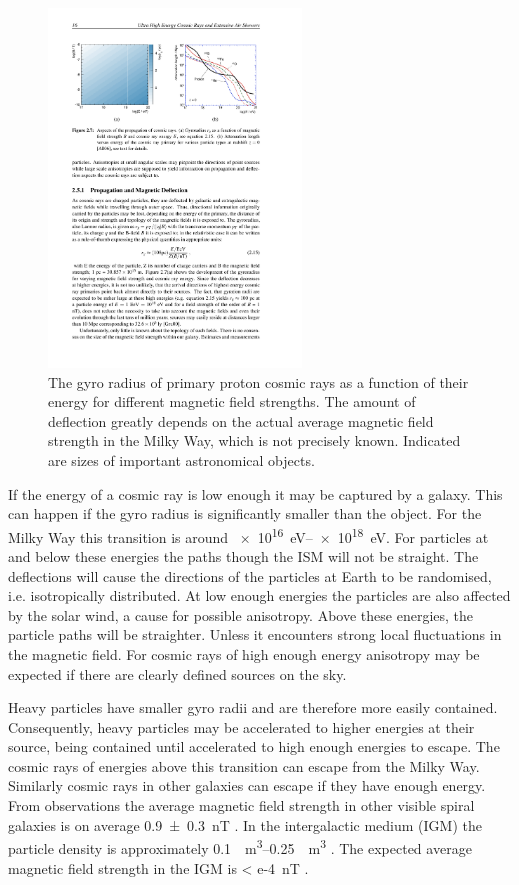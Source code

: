 \begin{figure}
    \centering
    \includegraphics[width=0.6\textwidth]
                    {plots/cosmic-rays/gyroradius}
    \caption{The gyro radius of primary proton cosmic rays as a function of their energy for different magnetic field strengths. The amount of deflection greatly depends on the actual average magnetic field strength in the Milky Way, which is not precisely known. Indicated are sizes of important astronomical objects.}
    \label{fig:gyroradius}
\end{figure}

If the energy of a cosmic ray is low enough it may be captured by a galaxy. This can happen if the gyro radius is significantly smaller than the object. For the Milky Way this transition is around \SIrange{e16}{e18}{\eV}. For particles at and below these energies the paths though the ISM will not be straight. The deflections will cause the directions of the particles at Earth to be randomised, i.e. isotropically distributed. At low enough energies the particles are also affected by the solar wind, a cause for possible anisotropy. Above these energies, the particle paths will be straighter. Unless it encounters strong local fluctuations in the magnetic field. For cosmic rays of high enough energy anisotropy may be expected if there are clearly defined sources on the sky.

Heavy particles have smaller gyro radii and are therefore more easily contained. Consequently, heavy particles may be accelerated to higher energies at their source, being contained until accelerated to high enough energies to escape. The cosmic rays of energies above this transition can escape from the Milky Way. Similarly cosmic rays in other galaxies can escape if they have enough energy. From observations the average magnetic field strength in other visible spiral galaxies is on average \SI{.9 \pm .3}{\nano\tesla} \cite{jansson2010magnetic}. In the intergalactic medium (IGM) the particle density is approximately \SIrange{0.1}{0.25}{\per\meter\cubed} \cite{copi1995igm}. The expected average magnetic field strength in the IGM is \SI{< e-4}{\nano\tesla} \cite{kronberg1994igm}.

